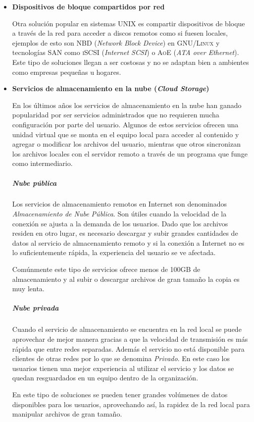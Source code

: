 \begin{itemize}
\newpage
      \item \textbf{Dispositivos de bloque compartidos por red}

Otra soluci\'{o}n popular en sistemas \textsc{UNIX} es compartir dispositivos de bloque a trav\'{e}s de la red para acceder a discos remotos como si fuesen locales, ejemplos de esto son \textsc{NBD} (\textit{Network Block Device}) en \textsc{GNU/Linux} y tecnolog\'{i}as \textsc{SAN} como \textsc{iSCSI} (\textit{Internet SCSI}) o \textsc{AoE} (\textit{ATA over Ethernet}). Este tipo de soluciones llegan a ser costosas y no se adaptan bien a ambientes como empresas peque\~{n}as u hogares.

      \item \textbf{Servicios de almacenamiento en la nube (\emph{Cloud Storage})}

En los \'{u}ltimos a\~{n}os los servicios de almacenamiento en la nube han ganado popularidad por ser servicios administrados que no requieren mucha configuraci\'{o}n por parte del usuario. Algunos de estos servicios ofrecen una unidad virtual que se monta en el equipo local para acceder al contenido y agregar o modificar los archivos del usuario, mientras que otros sincronizan los archivos locales con el servidor remoto a trav\'{e}s de un programa que funge como intermediario.

        \subparagraph*{Nube p\'{u}blica \\}

Los servicios de almacenamiento remotos en Internet son denominados \emph{Almacenamiento de Nube P\'{u}blica}. Son \'{u}tiles cuando la velocidad de la conexi\'{o}n se ajusta a la demanda de los usuarios. Dado que los archivos residen en otro lugar, es necesario descargar y subir grandes cantidades de datos al servicio de almacenamiento remoto y si la conexi\'{o}n a Internet no es lo suficientemente r\'{a}pida, la experiencia del usuario se ve afectada.

Com\'{u}nmente este tipo de servicios ofrece menos de 100GB de almacenamiento y al subir o descargar archivos de gran tama\~{n}o la copia es muy lenta.

        \subparagraph*{Nube privada \\}

Cuando el servicio de almacenamiento se encuentra en la red local se puede aprovechar de mejor manera gracias a que la velocidad de transmisi\'{o}n es m\'{a}s r\'{a}pida que entre redes separadas. Adem\'{a}s el servicio no est\'{a} disponible para clientes de otras redes por lo que se denomina \emph{Privado}. En este caso los usuarios tienen una mejor experiencia al utilizar el servicio y los datos se quedan resguardados en un equipo dentro de la organizaci\'{o}n.

En este tipo de soluciones se pueden tener grandes vol\'{u}menes de datos disponibles para los usuarios, aprovechando as\'{i}, la rapidez de la red local para manipular archivos de gran tama\~{n}o.

    \end{itemize}

